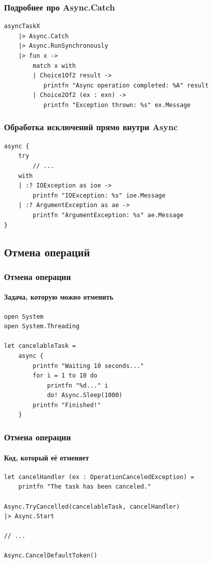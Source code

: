 \documentclass{../../slides-style}
\begin{document}
    \begin{frame}[fragile]
        \frametitle{Подробнее про Async.Catch}
        \begin{verbatim}
asyncTaskX
    |> Async.Catch
    |> Async.RunSynchronously
    |> fun x ->
        match x with
        | Choice1Of2 result -> 
           printfn "Async operation completed: %A" result
        | Choice2Of2 (ex : exn) -> 
           printfn "Exception thrown: %s" ex.Message
        \end{verbatim}
    \end{frame}
    
    \begin{frame}[fragile]
        \frametitle{Обработка исключений прямо внутри Async}
        \begin{verbatim}
async {
    try
        // ...
    with
    | :? IOException as ioe ->
        printfn "IOException: %s" ioe.Message
    | :? ArgumentException as ae ->
        printfn "ArgumentException: %s" ae.Message
}
        \end{verbatim}
    \end{frame}

    \subsection{Отмена операций}

    \begin{frame}[fragile]
        \frametitle{Отмена операции}
        \framesubtitle{Задача, которую можно отменить}
        \begin{verbatim}
open System
open System.Threading

let cancelableTask =
    async {
        printfn "Waiting 10 seconds..."
        for i = 1 to 10 do
            printfn "%d..." i
            do! Async.Sleep(1000)
        printfn "Finished!"
    }
        \end{verbatim}
    \end{frame}

    \begin{frame}[fragile]
        \frametitle{Отмена операции}
        \framesubtitle{Код, который её отменяет}
        \begin{verbatim}
let cancelHandler (ex : OperationCanceledException) =
    printfn "The task has been canceled."

Async.TryCancelled(cancelableTask, cancelHandler)
|> Async.Start

// ...

Async.CancelDefaultToken()
        \end{verbatim}
    \end{frame}
\end{document}
